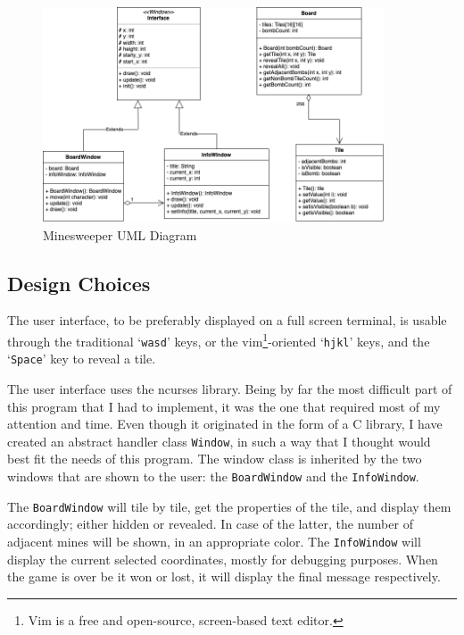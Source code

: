 \documentclass{article}
\newcommand{\code}[1]{\texttt{#1}}
\begin{document}
\vspace{9em}
\begin{figure}[h]
\centering
\includegraphics[width=0.9\textwidth]{images/minesweeper.png}
\caption{Minesweeper UML Diagram}
\end{figure}

\newpage

\subsection{Design Choices}

The user interface, to be preferably displayed on a full screen terminal, is
usable through the traditional `\code{wasd}' keys, or the vim\footnote{Vim is a free and open-source, screen-based text editor.}-oriented `\code{hjkl}' keys, and the `\code{Space}'
key to reveal a tile.

The user interface uses the ncurses library. Being by far the most
difficult part of this program that I had to implement, it was the one that required most of 
my attention and time. Even though it originated in the form of a C library, I have created
an abstract handler class \code{Window}, in such a way that I thought would best fit the
needs of this program. The window class is inherited by the two windows that are shown
to the user: the \code{BoardWindow} and the \code{InfoWindow}.

The \code{BoardWindow} will tile by tile, get the properties of the tile, and
display them accordingly; either hidden or revealed. In case of the latter, the number 
of adjacent mines will be shown, in an appropriate color. The \code{InfoWindow} will display the current selected coordinates, mostly for debugging
purposes. When the game is over be it won or lost, it will display the final message respectively.
\end{document}
